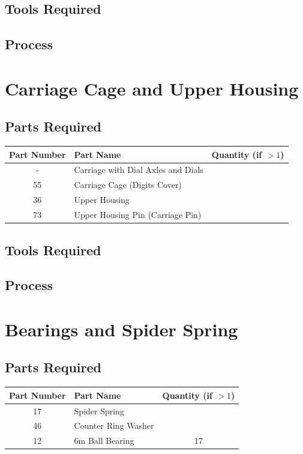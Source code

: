 \documentclass{article}
\begin{document}
\subsection{Tools Required}

\subsection{Process}


\newpage
\section{Carriage Cage and Upper Housing}
\subsection{Parts Required}
\begin{table}[h!]
	\centering
	\begin{tabular}{clc}
		Part Number & Part Name & Quantity (if $>1$) \\ \hline
		- & Carriage with Dial Axles and Dials & \\
		55 & Carriage Cage (Digits Cover) & \\
		36 & Upper Housing & \\
		73 & Upper Housing Pin (Carriage Pin) & 
	\end{tabular}
\end{table}

\subsection{Tools Required}

\subsection{Process}


\newpage
\section{Bearings and Spider Spring}
\subsection{Parts Required}
\begin{table}[h!]
	\centering
	\begin{tabular}{clc}
		Part Number & Part Name & Quantity (if $>1$) \\ \hline
		 17 & Spider Spring & \\ 
		 46 & Counter Ring Washer & \\ \hline \hline 
		 12 & 6m Ball Bearing & 17 
	\end{tabular}
\end{table}
\end{document}
